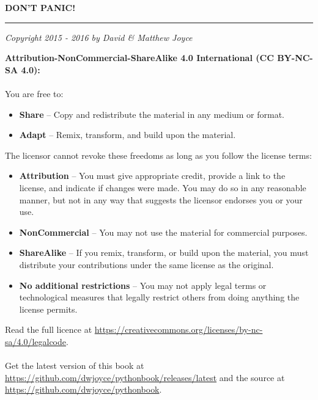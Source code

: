 {
\vspace*{\fill}
\begin{center}
\textbf{\fontsize{50}{50}\selectfont DON'T PANIC!}\\
\hfill\vspace{15pt}
\rule{\linewidth}{1.0mm}\hfill
\vspace{35pt}
\textit{Copyright} \textcopyright\; \textit{2015 - 2016 by David \& Matthew Joyce}\\
\vspace{20pt}
\end{center}
{\bfseries Attribution-NonCommercial-ShareAlike 4.0 International (CC BY-NC-SA 4.0):}\\~\\
\footnotesize You are free to:
\begin{itemize}
\item {\bfseries Share} -- Copy and redistribute the material in any medium or format.\\
\item {\bfseries Adapt} -- Remix, transform, and build upon the material.\\
\end{itemize}
The licensor cannot revoke these freedoms as long as you follow the license terms:
\begin{itemize}
\item {\bfseries Attribution} -- You must give appropriate credit, provide a link to the license, and indicate if changes were made. You may do so in any reasonable manner, but not in any way that suggests the licensor endorses you or your use.\\
\item {\bfseries NonCommercial} -- You may not use the material for commercial purposes.\\
\item {\bfseries ShareAlike} -- If you remix, transform, or build upon the material, you must distribute your contributions under the same license as the original.\\
\item {\bfseries No additional restrictions} -- You may not apply legal terms or technological measures that legally restrict others from doing anything the license permits.\\
\end{itemize}
Read the full licence at \url{https://creativecommons.org/licenses/by-nc-sa/4.0/legalcode}.\\~\\
Get the latest version of this book at \url{https://github.com/dwjoyce/pythonbook/releases/latest} and the source at \url{https://github.com/dwjoyce/pythonbook}.\\
\vspace*{\fill}
}